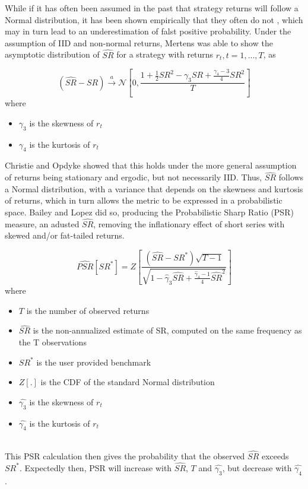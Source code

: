 \documentclass[a4paper,11pt,oneside]{article}
\theoremstyle{plain}
\theoremstyle{definition}
\begin{document}
	While if it has often been assumed in the past that strategy returns will follow a Normal distribution, it has been shown empirically that they often do not \cite{Brooks and Kat2002; Ingersoll 2007}, which may in turn lead to an underestimation of falst positive probability. Under the assumption of IID and non-normal returns, Mertens \cite{Mertens} was able to show the asymptotic distribution of $\widehat{SR}$ for a strategy with returns $r_t , t = 1, ..., T$,  as 
	
	\begin{equation}
	(\widehat{S R}-S R) \stackrel{a}{\rightarrow} \mathcal{N}\left[0, \frac{1+\frac{1}{2} S R^{2}-\gamma_{3} S R+\frac{\gamma_{4}-3}{4} S R^{2}}{T}\right]
	\end{equation}
	where
	\begin{itemize}
		\item [] $\gamma_3$ is the skewness of $r_t$
		\item [] $\gamma_4$ is the kurtosis of $r_t$
	\end{itemize}

	Christie \cite{Christie} and Opdyke \cite{Opdyke} showed that this holds under the more general assumption of returns being stationary and ergodic, but not necessarily IID. Thus, $\widehat{SR}$ follows a Normal distribution, with a variance that depends on the skewness and kurtosis of returns, which in turn allows the metric to be expressed in a probabilistic space. Bailey and Lopez did so, producing the Probabilistic Sharp Ratio (PSR) measure, an adusted $\widehat{SR}$, removing the inflationary effect of short series with skewed and/or fat-tailed returns. 
	
	\begin{equation}\label{eq_psr}
	\widehat{P S R}\left[S R^{*}\right]=Z\left[\frac{\left(\widehat{S R}-S R^{*}\right) \sqrt{T-1}}{\sqrt{1-\hat{\gamma}_{3} \widehat{S R}+\frac{\hat{\gamma}_{4}-1}{4} \widehat{S R}^{2}}}\right]
	\end{equation}
	where
	\begin{itemize}
		\item [] $T$ is the number of observed returns
		\item [] $\widehat{SR}$ is the non-annualized estimate of SR, computed on the same frequency as the T observations
		\item [] $SR^*$ is the user provided benchmark
		\item [] $Z[.]$ is the CDF of the standard Normal distribution
		\item [] $\hat{\gamma_3}$ is the skewness of $r_t$
		\item [] $\hat{\gamma_4}$ is the kurtosis of $r_t$	
	\end{itemize}
	~\\
	This PSR calculation then gives the probability that the observed $\widehat{SR}$ exceeds $SR^*$. Expectedly then, PSR will increase with $\widehat{SR}$, $T$ and $\hat{\gamma_3}$, but decrease with $\hat{\gamma_4}$.
		
\end{document}
